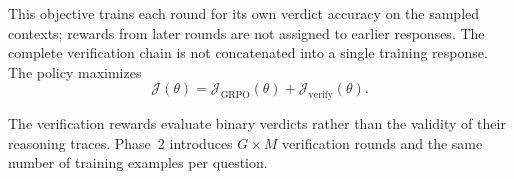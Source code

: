\documentclass[11pt]{article}
\theoremstyle{definition}
\theoremstyle{plain}
\begin{document}
This objective trains each round for its own verdict accuracy on the sampled contexts; rewards from later rounds are not assigned to earlier responses. The complete verification chain is not concatenated into a single training response. The policy maximizes
\begin{equation}
\boxed{
\mathcal J(\theta)
=
\mathcal J_{\mathrm{GRPO}}(\theta)
+
\mathcal J_{\mathrm{verify}}(\theta)
}.
\end{equation}

The verification rewards evaluate binary verdicts rather than the validity of their reasoning traces. Phase~2 introduces $G\times M$ verification rounds and the same number of training examples per question.









\end{document}
